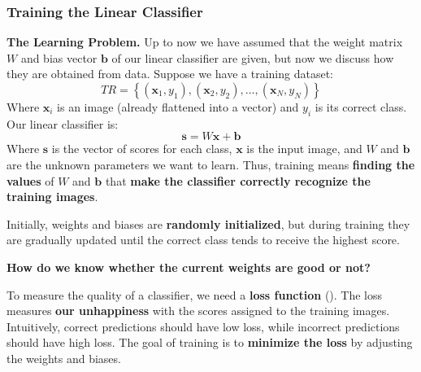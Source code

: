 \subsubsection{Training the Linear Classifier}\label{sec:training-linear-classifier}

\textcolor{Red2}{ \textbf{The Learning Problem.}} Up to now we have assumed that the weight matrix $W$ and bias vector $\mathbf{b}$ of our linear classifier are given, but now we discuss how they are obtained from data. Suppose we have a training dataset:
\begin{equation*}
    TR = \left\{\left(\mathbf{x}_{1}, y_{1}\right), \left(\mathbf{x}_{2}, y_{2}\right), \ldots, \left(\mathbf{x}_{N}, y_{N}\right)\right\}
\end{equation*}
Where $\mathbf{x}_{i}$ is an image (already flattened into a vector) and $y_{i}$ is its correct class. Our linear classifier is:
\begin{equation*}
    \mathbf{s} = W \mathbf{x} + \mathbf{b}
\end{equation*}
Where $\mathbf{s}$ is the vector of scores for each class, $\mathbf{x}$ is the input image, and $W$ and $\mathbf{b}$ are the unknown parameters we want to learn. Thus, training means \textbf{finding the values} of $W$ and $\mathbf{b}$ that \textbf{make the classifier correctly recognize the training images}.

\highspace
Initially, weights and biases are \textbf{randomly initialized}, but during training they are gradually updated until the correct class tends to receive the highest score.

\highspace
\begin{flushleft}
    \textcolor{Green3}{ \textbf{How do we know whether the current weights are good or not?}}
\end{flushleft}
To measure the quality of a classifier, we need a \textbf{loss function} (). The loss measures \textbf{our unhappiness} with the scores assigned to the training images. Intuitively, correct predictions should have low loss, while incorrect predictions should have high loss. The goal of training is to \textbf{minimize the loss} by adjusting the weights and biases.

